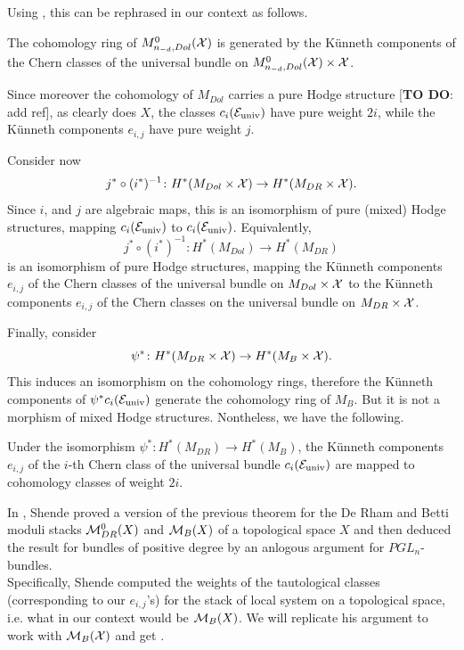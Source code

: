 Using , this can be rephrased in our context as follows.
\begin{thm}
The cohomology ring of $M_{n_{-d}, Dol}^0(\mathcal{X})$ is generated by the K\"unneth components of the Chern classes of the universal bundle on $M_{n_{-d}, Dol}^0(\mathcal{X}) \times \mathcal{X}$.
\end{thm}
Since moreover the cohomology of $M_{Dol}$ carries a pure Hodge structure [\textbf{TO DO}: add ref], as clearly does $X$, the classes $c_i(\mathcal{E}_{\text{univ}})$ have pure weight $2i$, while the K\"unneth components $e_{i,j}$ have pure weight $j$.

Consider now
\begin{equation}
j^* \circ (i^*)^{-1} \colon H^*(M_{Dol} \times \mathcal{X}) \to H^*(M_{DR} \times \mathcal{X}).
\end{equation}
Since $i$, and $j$ are algebraic maps, this is an isomorphism of pure (mixed) Hodge structures, mapping $c_i(\mathcal{E}_{\text{univ}})$ to $c_i(\mathcal{E}_{\text{univ}})$. Equivalently,
\begin{equation}
j^* \circ (i^*)^{-1} \colon H^*(M_{Dol}) \to H^*(M_{DR})
\end{equation}
is an isomorphism of pure Hodge structures, mapping the K\"unneth components $e_{i,j}$ of the Chern classes of the universal bundle on $M_{Dol} \times \mathcal{X}$ to the K\"unneth components $e_{i,j}$ of the Chern classes on the universal bundle on $M_{DR} \times \mathcal{X}$.

Finally, consider
\begin{equation}
\psi^* \colon H^*(M_{DR} \times \mathcal{X}) \to H^*(M_{B} \times \mathcal{X}).
\end{equation}
This induces an isomorphism on the cohomology rings, therefore the K\"unneth components of $\psi^* c_i(\mathcal{E}_{\text{univ}})$ generate the cohomology ring of $M_{B}$. But it is not a morphism of mixed Hodge structures. Nontheless, we have the following.
\begin{thm} \label{thm: weights of the tautological classes in betti moduli space}
Under the isomorphism $\psi^* \colon  H^*(M_{DR}) \to H^*(M_{B})$, the K\"unneth components $e_{i,j}$ of the $i$-th Chern class of the universal bundle $c_i(\mathcal{E}_{\text{univ}})$ are mapped to cohomology classes of weight $2i$.
\end{thm}

In \cite{Shende-weights}, Shende proved a version of the previous theorem for the De Rham and Betti moduli stacks $\mathcal{M}_{DR}^0(X)$ and $\mathcal{M}_B(X)$ of a topological space $X$ and then deduced the result for bundles of positive degree by an anlogous argument for $PGL_n$-bundles.\\
Specifically, Shende computed the weights of the tautological classes (corresponding to our $e_{i,j}$'s) for the stack of local system on a topological space, i.e. what in our context would be $\mathcal{M}_{B}(X)$. We will replicate his argument to work with $\mathcal{M}_B(\mathcal{X})$ and get .